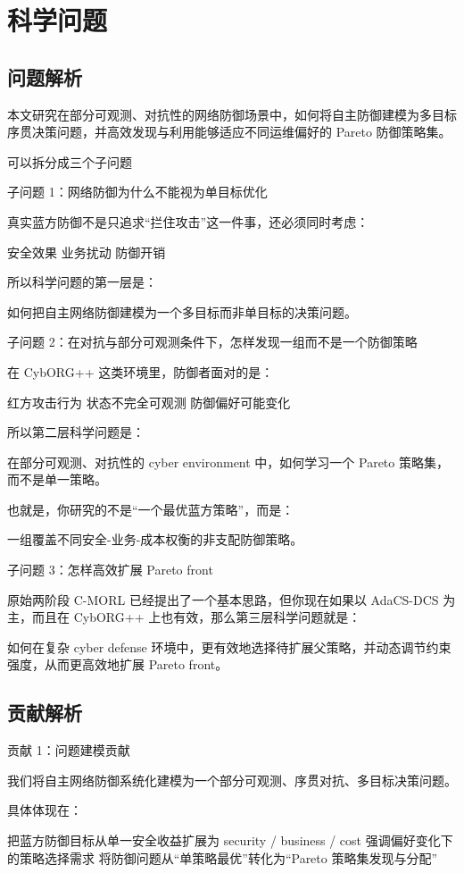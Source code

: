 \documentclass[12pt,a4paper]{article}
\begin{document}
\section{科学问题}
\subsection{问题解析}
本文研究在部分可观测、对抗性的网络防御场景中，如何将自主防御建模为多目标序贯决策问题，并高效发现与利用能够适应不同运维偏好的 Pareto 防御策略集。

可以拆分成三个子问题

子问题 1：网络防御为什么不能视为单目标优化

真实蓝方防御不是只追求“拦住攻击”这一件事，还必须同时考虑：

安全效果
业务扰动
防御开销

所以科学问题的第一层是：

如何把自主网络防御建模为一个多目标而非单目标的决策问题。

子问题 2：在对抗与部分可观测条件下，怎样发现一组而不是一个防御策略

在 CybORG++ 这类环境里，防御者面对的是：

红方攻击行为
状态不完全可观测
防御偏好可能变化

所以第二层科学问题是：

在部分可观测、对抗性的 cyber environment 中，如何学习一个 Pareto 策略集，而不是单一策略。

也就是，你研究的不是“一个最优蓝方策略”，而是：

一组覆盖不同安全-业务-成本权衡的非支配防御策略。

子问题 3：怎样高效扩展 Pareto front

原始两阶段 C-MORL 已经提出了一个基本思路，但你现在如果以 AdaCS-DCS 为主，而且在 CybORG++ 上也有效，那么第三层科学问题就是：

如何在复杂 cyber defense 环境中，更有效地选择待扩展父策略，并动态调节约束强度，从而更高效地扩展 Pareto front。

\subsection{贡献解析}

贡献 1：问题建模贡献

我们将自主网络防御系统化建模为一个部分可观测、序贯对抗、多目标决策问题。

具体体现在：

把蓝方防御目标从单一安全收益扩展为 security / business / cost
强调偏好变化下的策略选择需求
将防御问题从“单策略最优”转化为“Pareto 策略集发现与分配”
\end{document}
